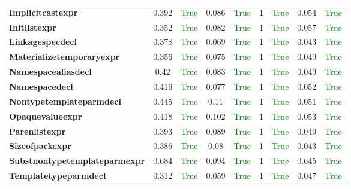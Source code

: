 \documentclass{article}
\begin{document}
\begin{xltabular}{\textwidth}{lcccccccc}
\textbf{{\fontsize{10}{12}\selectfont Implicitcastexpr}}& 0.392&\textcolor{green}{True}& 0.086&\textcolor{green}{True}& 1&\textcolor{green}{True}& 0.054&\textcolor{green}{True} \\[0.5ex]
\textbf{{\fontsize{10}{12}\selectfont Initlistexpr}}& 0.352&\textcolor{green}{True}& 0.082&\textcolor{green}{True}& 1&\textcolor{green}{True}& 0.057&\textcolor{green}{True} \\[0.5ex]
\textbf{{\fontsize{10}{12}\selectfont Linkagespecdecl}}& 0.378&\textcolor{green}{True}& 0.069&\textcolor{green}{True}& 1&\textcolor{green}{True}& 0.043&\textcolor{green}{True} \\[0.5ex]
\textbf{{\fontsize{10}{12}\selectfont Materializetemporaryexpr}}& 0.356&\textcolor{green}{True}& 0.075&\textcolor{green}{True}& 1&\textcolor{green}{True}& 0.049&\textcolor{green}{True} \\[0.5ex]
\textbf{{\fontsize{10}{12}\selectfont Namespacealiasdecl}}& 0.42&\textcolor{green}{True}& 0.083&\textcolor{green}{True}& 1&\textcolor{green}{True}& 0.049&\textcolor{green}{True} \\[0.5ex]
\textbf{{\fontsize{10}{12}\selectfont Namespacedecl}}& 0.416&\textcolor{green}{True}& 0.077&\textcolor{green}{True}& 1&\textcolor{green}{True}& 0.052&\textcolor{green}{True} \\[0.5ex]
\textbf{{\fontsize{10}{12}\selectfont Nontypetemplateparmdecl}}& 0.445&\textcolor{green}{True}& 0.11&\textcolor{green}{True}& 1&\textcolor{green}{True}& 0.051&\textcolor{green}{True} \\[0.5ex]
\textbf{{\fontsize{10}{12}\selectfont Opaquevalueexpr}}& 0.418&\textcolor{green}{True}& 0.102&\textcolor{green}{True}& 1&\textcolor{green}{True}& 0.053&\textcolor{green}{True} \\[0.5ex]
\textbf{{\fontsize{10}{12}\selectfont Parenlistexpr}}& 0.393&\textcolor{green}{True}& 0.089&\textcolor{green}{True}& 1&\textcolor{green}{True}& 0.049&\textcolor{green}{True} \\[0.5ex]
\textbf{{\fontsize{10}{12}\selectfont Sizeofpackexpr}}& 0.386&\textcolor{green}{True}& 0.08&\textcolor{green}{True}& 1&\textcolor{green}{True}& 0.043&\textcolor{green}{True} \\[0.5ex]
\textbf{{\fontsize{10}{12}\selectfont Substnontypetemplateparmexpr}}& 0.684&\textcolor{green}{True}& 0.094&\textcolor{green}{True}& 1&\textcolor{green}{True}& 0.645&\textcolor{green}{True} \\[0.5ex]
\textbf{{\fontsize{10}{12}\selectfont Templatetypeparmdecl}}& 0.312&\textcolor{green}{True}& 0.059&\textcolor{green}{True}& 1&\textcolor{green}{True}& 0.047&\textcolor{green}{True} \\[0.5ex]

\end{xltabular}
\end{document}
